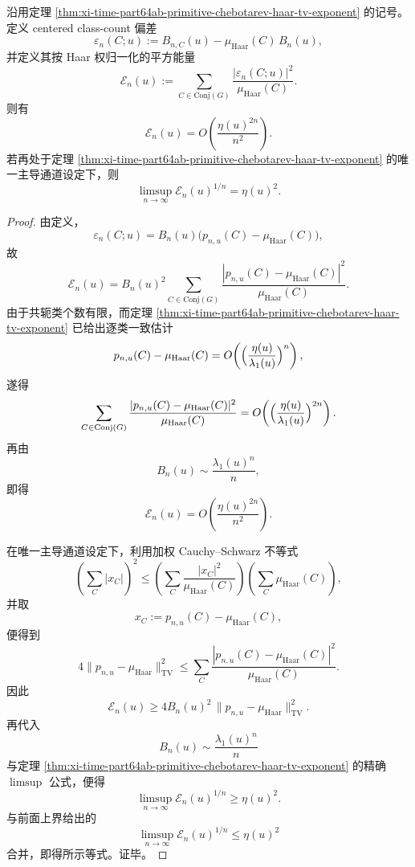 \begin{theorem}\label{thm:xi-time-part64ab-chebotarev-plancherel-l2-exponent}
沿用定理 \ref{thm:xi-time-part64ab-primitive-chebotarev-haar-tv-exponent} 的记号。定义 centered class-count 偏差
\[
\varepsilon_n(C;u):=
B_{n,C}(u)-\mu_{\mathrm{Haar}}(C)\,B_n(u),
\]
并定义其按 Haar 权归一化的平方能量
\[
\mathcal E_n(u)
:=
\sum_{C\in\mathrm{Conj}(G)}
\frac{|\varepsilon_n(C;u)|^2}{\mu_{\mathrm{Haar}}(C)}.
\]
则有
\[
\boxed{\;
\mathcal E_n(u)
=
O\!\left(\frac{\eta(u)^{2n}}{n^2}\right).\;}
\]
若再处于定理 \ref{thm:xi-time-part64ab-primitive-chebotarev-haar-tv-exponent} 的唯一主导通道设定下，则
\[
\boxed{\;
\limsup_{n\to\infty}\mathcal E_n(u)^{1/n}
=
\eta(u)^2.\;}
\]
\end{theorem}
\begin{proof}
由定义，
\[
\varepsilon_n(C;u)=B_n(u)\bigl(p_{n,u}(C)-\mu_{\mathrm{Haar}}(C)\bigr),
\]
故
\[
\mathcal E_n(u)
=
B_n(u)^2
\sum_{C\in\mathrm{Conj}(G)}
\frac{|p_{n,u}(C)-\mu_{\mathrm{Haar}}(C)|^2}{\mu_{\mathrm{Haar}}(C)}.
\]
由于共轭类个数有限，而定理
\ref{thm:xi-time-part64ab-primitive-chebotarev-haar-tv-exponent} 已给出逐类一致估计
\[
p_{n,u}(C)-\mu_{\mathrm{Haar}}(C)
=
O\!\left(\Bigl(\frac{\eta(u)}{\lambda_1(u)}\Bigr)^n\right),
\]
遂得
\[
\sum_{C\in\mathrm{Conj}(G)}
\frac{|p_{n,u}(C)-\mu_{\mathrm{Haar}}(C)|^2}{\mu_{\mathrm{Haar}}(C)}
=
O\!\left(\Bigl(\frac{\eta(u)}{\lambda_1(u)}\Bigr)^{2n}\right).
\]
再由
\[
B_n(u)\sim \frac{\lambda_1(u)^n}{n},
\]
即得
\[
\mathcal E_n(u)
=
O\!\left(\frac{\eta(u)^{2n}}{n^2}\right).
\]

在唯一主导通道设定下，利用加权 Cauchy--Schwarz 不等式
\[
\left(\sum_{C}|x_C|\right)^2
\le
\left(\sum_C \frac{|x_C|^2}{\mu_{\mathrm{Haar}}(C)}\right)
\left(\sum_C \mu_{\mathrm{Haar}}(C)\right),
\]
并取
\[
x_C:=p_{n,u}(C)-\mu_{\mathrm{Haar}}(C),
\]
便得到
\[
4\|p_{n,u}-\mu_{\mathrm{Haar}}\|_{\mathrm{TV}}^2
\le
\sum_{C}
\frac{|p_{n,u}(C)-\mu_{\mathrm{Haar}}(C)|^2}{\mu_{\mathrm{Haar}}(C)}.
\]
因此
\[
\mathcal E_n(u)
\ge
4B_n(u)^2\,\|p_{n,u}-\mu_{\mathrm{Haar}}\|_{\mathrm{TV}}^2.
\]
再代入
\[
B_n(u)\sim \frac{\lambda_1(u)^n}{n}
\]
与定理 \ref{thm:xi-time-part64ab-primitive-chebotarev-haar-tv-exponent} 的精确 \(\limsup\) 公式，便得
\[
\limsup_{n\to\infty}\mathcal E_n(u)^{1/n}\ge \eta(u)^2.
\]
与前面上界给出的
\[
\limsup_{n\to\infty}\mathcal E_n(u)^{1/n}\le \eta(u)^2
\]
合并，即得所示等式。证毕。
\end{proof}

